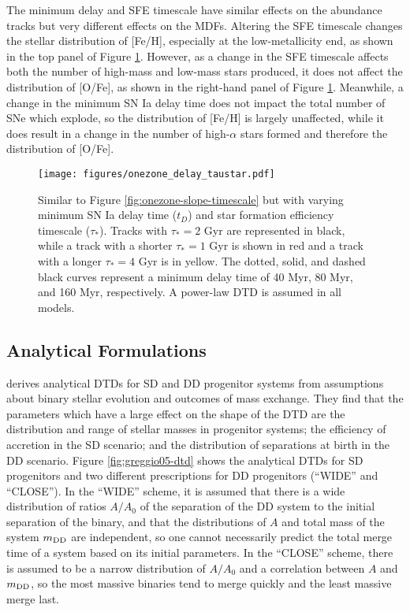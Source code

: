 \documentclass[twocolumn]{aastex631}
\begin{document}
The minimum delay and SFE timescale have similar effects on the abundance tracks but very different effects on the MDFs. Altering the SFE timescale changes the stellar distribution of [Fe/H], especially at the low-metallicity end, as shown in the top panel of Figure \ref{fig:onezone-delay-taustar}. However, as a change in the SFE timescale affects both the number of high-mass and low-mass stars produced, it does not affect the distribution of [O/Fe], as shown in the right-hand panel of Figure \ref{fig:onezone-delay-taustar}. Meanwhile, a change in the minimum SN Ia delay time does not impact the total number of SNe which explode, so the distribution of [Fe/H] is largely unaffected, while it does result in a change in the number of high-$\alpha$ stars formed and therefore the distribution of [O/Fe].

\begin{figure}
    \centering
    \texttt{[image: figures/onezone\_delay\_taustar.pdf]}
    \caption{Similar to Figure \ref{fig:onezone-slope-timescale} but with varying minimum SN Ia delay time ($t_D$) and star formation efficiency timescale ($\tau_*$). Tracks with $\tau_*=2$ Gyr are represented in black, while a track with a shorter $\tau_*=1$ Gyr is shown in red and a track with a longer $\tau_*=4$ Gyr is in yellow. The dotted, solid, and dashed black curves represent a minimum delay time of 40 Myr, 80 Myr, and 160 Myr, respectively. A power-law DTD is assumed in all models.}
    \label{fig:onezone-delay-taustar}
\end{figure}

\subsection{Analytical Formulations}

\citet{Greggio2005-AnalyticalRates} derives analytical DTDs for SD and DD progenitor systems from assumptions about binary stellar evolution and outcomes of mass exchange. They find that the parameters which have a large effect on the shape of the DTD are the distribution and range of stellar masses in progenitor systems; the efficiency of accretion in the SD scenario; and the distribution of separations at birth in the DD scenario. Figure \ref{fig:greggio05-dtd} shows the analytical DTDs for SD progenitors and two different prescriptions for DD progenitors (``WIDE'' and ``CLOSE''). In the ``WIDE'' scheme, it is assumed that there is a wide distribution of ratios $A/A_0$ of the separation of the DD system to the initial separation of the binary, and that the distributions of $A$ and total mass of the system $m_{\rm{DD}}$ are independent, so one cannot necessarily predict the total merge time of a system based on its initial parameters. In the ``CLOSE'' scheme, there is assumed to be a narrow distribution of $A/A_0$ and a correlation between $A$ and $m_{\rm{DD}}$, so the most massive binaries tend to merge quickly and the least massive merge last.
\end{document}
